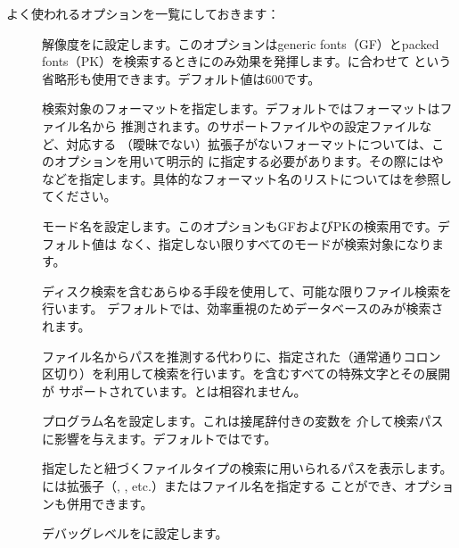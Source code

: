 \documentclass[uplatex,dvipdfmx,12pt,tombow]{jsarticle}
\begin{document}
よく使われるオプションを一覧にしておきます：
%
\begin{description}
\item[]
解像度をに設定します。このオプションはgeneric fonts（GF）とpacked
fonts（PK）を検索するときにのみ効果を発揮します。に合わせて%
という省略形も使用できます。デフォルト値は600です。

\item[]
検索対象のフォーマットを指定します。デフォルトではフォーマットはファイル名から
推測されます。\MP のサポートファイルやの設定ファイルなど、対応する
（曖昧でない）拡張子がないフォーマットについては、このオプションを用いて明示的
に指定する必要があります。その際にはやなどを指定します。具体的なフォーマット名のリストについてはを参照してください。

\item[]
モード名を設定します。このオプションもGFおよびPKの検索用です。デフォルト値は
なく、指定しない限りすべてのモードが検索対象になります。

\item[]
ディスク検索を含むあらゆる手段を使用して、可能な限りファイル検索を行います。
デフォルトでは、効率重視のためデータベースのみが検索されます。

\item[]
ファイル名からパスを推測する代わりに、指定された（通常通りコロン
区切り）を利用して検索を行います。\samp{//}を含むすべての特殊文字とその展開が
サポートされています。とは相容れません。

\item[]
プログラム名を設定します。これは接尾辞付きの変数を
介して検索パスに影響を与えます。デフォルトではです。

\item[]
指定したと紐づくファイルタイプの検索に用いられるパスを表示します。
には拡張子（, , etc.）またはファイル名を指定する
ことができ、オプションも併用できます。

\item[]
デバッグレベルをに設定します。
\end{description}
\end{document}
